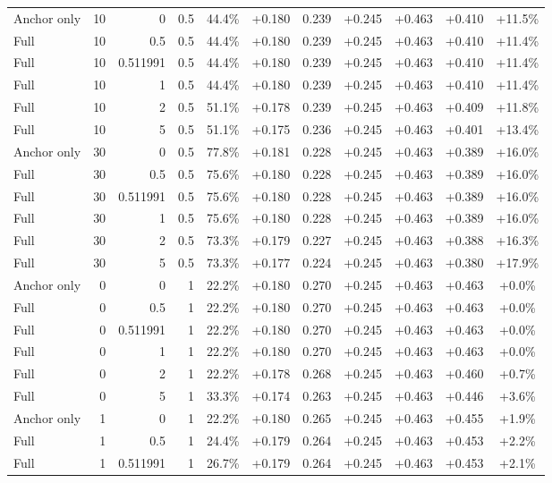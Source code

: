 \begin{table}[htbp]
\begin{tabular}{lrrrccccccc}
Anchor only & 10 & 0 & 0.5 & 44.4\% & +0.180 & 0.239 & +0.245 & +0.463 & +0.410 & +11.5\% \\
Full & 10 & 0.5 & 0.5 & 44.4\% & +0.180 & 0.239 & +0.245 & +0.463 & +0.410 & +11.4\% \\
Full & 10 & 0.511991 & 0.5 & 44.4\% & +0.180 & 0.239 & +0.245 & +0.463 & +0.410 & +11.4\% \\
Full & 10 & 1 & 0.5 & 44.4\% & +0.180 & 0.239 & +0.245 & +0.463 & +0.410 & +11.4\% \\
Full & 10 & 2 & 0.5 & 51.1\% & +0.178 & 0.239 & +0.245 & +0.463 & +0.409 & +11.8\% \\
Full & 10 & 5 & 0.5 & 51.1\% & +0.175 & 0.236 & +0.245 & +0.463 & +0.401 & +13.4\% \\
Anchor only & 30 & 0 & 0.5 & 77.8\% & +0.181 & 0.228 & +0.245 & +0.463 & +0.389 & +16.0\% \\
Full & 30 & 0.5 & 0.5 & 75.6\% & +0.180 & 0.228 & +0.245 & +0.463 & +0.389 & +16.0\% \\
Full & 30 & 0.511991 & 0.5 & 75.6\% & +0.180 & 0.228 & +0.245 & +0.463 & +0.389 & +16.0\% \\
Full & 30 & 1 & 0.5 & 75.6\% & +0.180 & 0.228 & +0.245 & +0.463 & +0.389 & +16.0\% \\
Full & 30 & 2 & 0.5 & 73.3\% & +0.179 & 0.227 & +0.245 & +0.463 & +0.388 & +16.3\% \\
Full & 30 & 5 & 0.5 & 73.3\% & +0.177 & 0.224 & +0.245 & +0.463 & +0.380 & +17.9\% \\
Anchor only & 0 & 0 & 1 & 22.2\% & +0.180 & 0.270 & +0.245 & +0.463 & +0.463 & +0.0\% \\
Full & 0 & 0.5 & 1 & 22.2\% & +0.180 & 0.270 & +0.245 & +0.463 & +0.463 & +0.0\% \\
Full & 0 & 0.511991 & 1 & 22.2\% & +0.180 & 0.270 & +0.245 & +0.463 & +0.463 & +0.0\% \\
Full & 0 & 1 & 1 & 22.2\% & +0.180 & 0.270 & +0.245 & +0.463 & +0.463 & +0.0\% \\
Full & 0 & 2 & 1 & 22.2\% & +0.178 & 0.268 & +0.245 & +0.463 & +0.460 & +0.7\% \\
Full & 0 & 5 & 1 & 33.3\% & +0.174 & 0.263 & +0.245 & +0.463 & +0.446 & +3.6\% \\
Anchor only & 1 & 0 & 1 & 22.2\% & +0.180 & 0.265 & +0.245 & +0.463 & +0.455 & +1.9\% \\
Full & 1 & 0.5 & 1 & 24.4\% & +0.179 & 0.264 & +0.245 & +0.463 & +0.453 & +2.2\% \\
Full & 1 & 0.511991 & 1 & 26.7\% & +0.179 & 0.264 & +0.245 & +0.463 & +0.453 & +2.1\% \\

\end{tabular}
\end{table}
